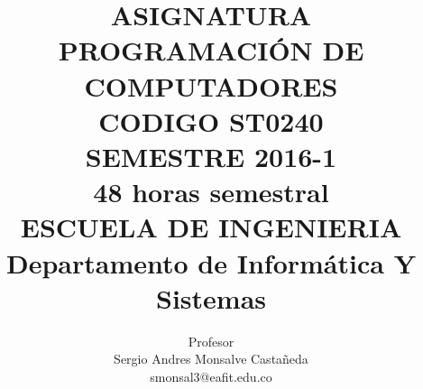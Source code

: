 \documentclass[11pt,letterpaper]{article}
\title{
	ASIGNATURA\\
	PROGRAMACIÓN DE COMPUTADORES\\
	CODIGO ST0240\\[2cm]
	SEMESTRE 2016-1\\
	48 horas semestral\\
	ESCUELA DE INGENIERIA\\[1cm]
	Departamento de Informática Y Sistemas
}
\author{
	Profesor\\
	Sergio Andres Monsalve Castañeda\\
	smonsal3@eafit.edu.co
}
\begin{document}
 
\pagestyle{fancyplain}
\fancyhf{}
\headheight=20pt %
\renewcommand{\headrulewidth}{0pt} %


\fancyfoot[c]{\thepage}

\maketitle

\begin{minipage}{3cm}
\end{minipage}
\cite{Melo2009}





\newpage

\newpage


\end{document}
